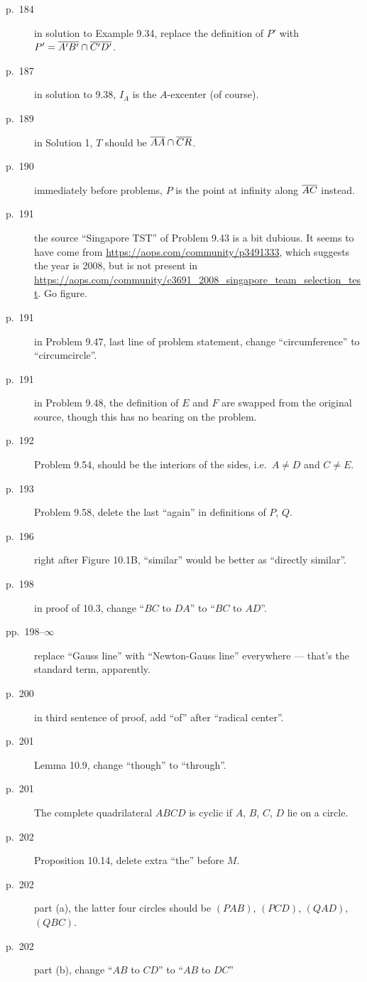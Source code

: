 \documentclass[11pt]{scrartcl}
\begin{document}
\begin{description}
\item[p.\  184] in solution to Example 9.34,
  replace the definition of $P'$ with $P' = \overline{A'B'} \cap \overline{C'D'}$.
\item[p.\  187] in solution to 9.38, $I_A$ is the $A$-excenter (of course).
\item[p.\  189] in Solution 1, $T$ should be $\overline{AA} \cap \overline{CR}$.
\item[p.\  190] immediately before problems, $P$ is the point at infinity along $\overline{AC}$ instead.
\item[p.\  191] the source ``Singapore TST'' of Problem 9.43 is a bit dubious.
  It seems to have come from \url{https://aops.com/community/p3491333},
  which suggests the year is 2008,
  but is not present in \url{https://aops.com/community/c3691_2008_singapore_team_selection_test}.
  Go figure.
\item[p.\  191] in Problem 9.47, last line of problem statement,
  change ``circumference'' to ``circumcircle''.
\item[p.\  191] in Problem 9.48, the definition of $E$ and $F$ are swapped from
  the original source, though this has no bearing on the problem.
\item[p.\  192] Problem 9.54, should be the interiors of the sides, i.e.\ $A \neq D$ and $C \neq E$.
\item[p.\  193] Problem 9.58, delete the last ``again'' in definitions of $P$, $Q$.
\item[p.\  196] right after Figure 10.1B, ``similar'' would be better as ``directly similar''.
\item[p.\  198] in proof of 10.3, change ``$BC$ to $DA$'' to ``$BC$ to $AD$''.
\item[pp.\  198--$\infty$] replace ``Gauss line'' with ``Newton-Gauss line''
  everywhere --- that's the standard term, apparently.
\item[p.\  200] in third sentence of proof, add ``of'' after ``radical center''.
\item[p.\  201] Lemma 10.9, change ``though'' to ``through''.
\item[p.\  201] The complete quadrilateral $ABCD$ is cyclic if $A$, $B$, $C$, $D$ lie on a circle.
\item[p.\  202] Proposition 10.14, delete extra ``the'' before $M$.
\item[p.\  202] part (a), the latter four circles should be
  $(PAB)$, $(PCD)$, $(QAD)$, $(QBC)$.
\item[p.\  202] part (b), change ``$AB$ to $CD$'' to ``$AB$ to $DC$''

\end{description}
\end{document}
